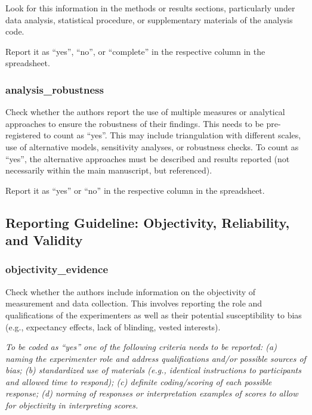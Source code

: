 {Look for this information in the methods or results sections, particularly under data analysis, statistical procedure, or supplementary materials of the analysis code.

Report it as ``yes'', ``no'', or ``complete'' in the respective column in the spreadsheet.

\subsubsection*{analysis\_robustness}
\label{robustness}
Check whether the authors report the use of multiple measures or analytical approaches to ensure the robustness of their findings. This needs to be pre-registered to count as ``yes''. This may include triangulation with different scales, use of alternative models, sensitivity analyses, or robustness checks. To count as ``yes'', the alternative approaches must be described and results reported (not necessarily within the main manuscript, but referenced).

Report it as ``yes'' or ``no'' in the respective column in the spreadsheet.


\subsection*{Reporting Guideline: Objectivity, Reliability, and Validity}

\subsubsection*{objectivity\_evidence}
\label{objectivity}
Check whether the authors include information on the objectivity of measurement and data collection. This involves reporting the role and qualifications of the experimenters as well as their potential susceptibility to bias (e.g., expectancy effects, lack of blinding, vested interests). 

\textit{To be coded as ``yes'' one of the following criteria needs to be reported: (a) naming the experimenter role and address qualifications and/or possible sources of bias; (b) standardized use of materials (e.g., identical instructions to participants and allowed time to respond); (c) definite coding/scoring of each possible response; (d) norming of responses or interpretation examples of scores to allow for objectivity in interpreting scores.} 

}
